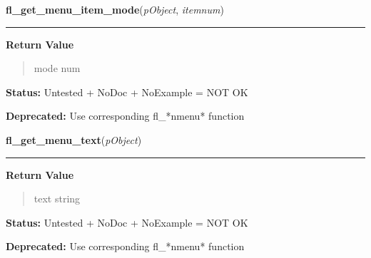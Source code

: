     \label{xformslib:library:fl_get_menu_item_mode}

    \vspace{0.5ex}

\hspace{.8\funcindent}\begin{boxedminipage}{\funcwidth}

    \raggedright \textbf{fl\_get\_menu\_item\_mode}(\textit{pObject}, \textit{itemnum})

    \vspace{-1.5ex}

    \rule{\textwidth}{0.5\fboxrule}
\setlength{\parskip}{2ex}
\setlength{\parskip}{1ex}
      \textbf{Return Value}
    \vspace{-1ex}

      \begin{quote}
      mode num

      \end{quote}

\textbf{Status:} Untested + NoDoc + NoExample = NOT OK



\textbf{Deprecated:} Use corresponding fl\_*nmenu* function



    \end{boxedminipage}

    \label{xformslib:library:fl_get_menu_text}

    \vspace{0.5ex}

\hspace{.8\funcindent}\begin{boxedminipage}{\funcwidth}

    \raggedright \textbf{fl\_get\_menu\_text}(\textit{pObject})

    \vspace{-1.5ex}

    \rule{\textwidth}{0.5\fboxrule}
\setlength{\parskip}{2ex}
\setlength{\parskip}{1ex}
      \textbf{Return Value}
    \vspace{-1ex}

      \begin{quote}
      text string

      \end{quote}

\textbf{Status:} Untested + NoDoc + NoExample = NOT OK



\textbf{Deprecated:} Use corresponding fl\_*nmenu* function



    \end{boxedminipage}

